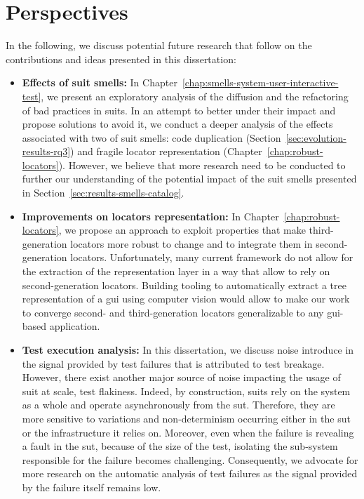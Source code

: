 \section{Perspectives}

In the following, we discuss potential future research that follow on the contributions and ideas presented in this dissertation:

\begin{itemize}
    \item \textbf{Effects of \gls{suit} smells:} In Chapter~\ref{chap:smells-system-user-interactive-test}, we present an exploratory analysis of the diffusion and the refactoring of bad practices in \gls{suit}s. In an attempt to better under their impact and propose solutions to avoid it, we conduct a deeper analysis of the effects associated with two of \gls{suit} smells: code duplication (Section~\ref{sec:evolution-results-rq3}) and fragile locator representation (Chapter~\ref{chap:robust-locators}). However, we believe that more research need to be conducted to further our understanding of the potential impact of the \gls{suit} smells presented in Section~\ref{sec:results-smells-catalog}.
    
    \item \textbf{Improvements on locators representation:} In Chapter~\ref{chap:robust-locators}, we propose an approach to exploit properties that make third-generation locators more robust to change and to integrate them in second-generation locators. Unfortunately, many current framework do not allow for the extraction of the representation layer in a way that allow to rely on second-generation locators. Building tooling to automatically extract a tree representation of a \gls{gui} using computer vision would allow to make our work to converge second- and third-generation locators generalizable to any \gls{gui}-based application.
    
    \item \textbf{Test execution analysis:} In this dissertation, we discuss noise introduce in the signal provided by test failures that is attributed to test breakage. However, there exist another major source of noise impacting the usage of \gls{suit} at scale, test flakiness. Indeed, by construction, \gls{suit}s rely on the system as a whole and operate asynchronously from the \gls{sut}. Therefore, they are more sensitive to  variations and non-determinism occurring either in the \gls{sut} or the infrastructure it relies on. Moreover, even when the failure is revealing a fault in the \gls{sut}, because of the size of the test, isolating the sub-system responsible for the failure becomes challenging. Consequently, we advocate for more research on the automatic analysis of test failures as the signal provided by the failure itself remains low. 
\end{itemize}
